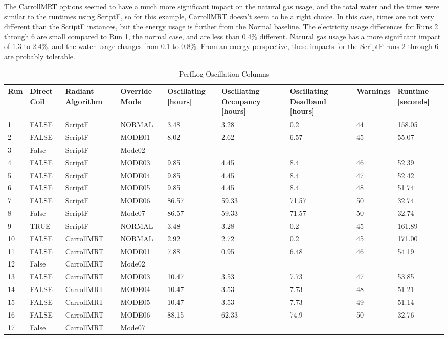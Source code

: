 The CarrollMRT options seemed to have a much more significant impact on the natural gas usage, and the total water and the times were similar to the runtimes using ScriptF, so for this example, CarrollMRT doesn’t seem to be a right choice. In this case, times are not very different than the ScriptF instances, but the energy usage is further from the Normal baseline. The electricity usage differences for Runs 2 through 6 are small compared to Run 1, the normal case, and are less than 0.4\% different. Natural gas usage has a more significant impact of 1.3 to 2.4\%, and the water usage changes from 0.1 to 0.8\%. From an energy perspective, these impacts for the ScriptF runs 2 through 6 are probably tolerable. 


{\scriptsize
\begin{longtable}[c]{p{0.2in}p{0.4in}p{0.6in}p{0.7in}p{0.5in}p{0.5in}p{0.7in}p{0.6in}p{0.65in}}
\caption{PerfLog Oscillation Columns\label{table:perflog_mode_columns}} \tabularnewline
\toprule
Run & 
Direct Coil & 
Radiant Algorithm & 
Override Mode & 
  Oscillating {[}hours{]} &
  Oscillating Occupancy {[}hours{]} &
  Oscillating Deadband {[}hours{]} &
  Warnings &
  Runtime {[}seconds{]} \tabularnewline
\midrule
\endfirsthead
1  & FALSE & ScriptF    & NORMAL & 3.48  & 3.28  & 0.2   & 44 & 158.05 \tabularnewline
2  & FALSE & ScriptF    & MODE01 & 8.02  & 2.62  & 6.57  & 45 & 55.07  \tabularnewline
3  & False & ScriptF    & Mode02 &       &       &       &    &        \tabularnewline
4  & FALSE & ScriptF    & MODE03 & 9.85  & 4.45  & 8.4   & 46 & 52.39  \tabularnewline
5  & FALSE & ScriptF    & MODE04 & 9.85  & 4.45  & 8.4   & 47 & 52.42  \tabularnewline
6  & FALSE & ScriptF    & MODE05 & 9.85  & 4.45  & 8.4   & 48 & 51.74  \tabularnewline
7  & FALSE & ScriptF    & MODE06 & 86.57 & 59.33 & 71.57 & 50 & 32.74  \tabularnewline
8  & False & ScriptF    & Mode07 & 86.57 & 59.33 & 71.57 & 50 & 32.74  \tabularnewline
9  & TRUE  & ScriptF    & NORMAL & 3.48  & 3.28  & 0.2   & 45 & 161.89 \tabularnewline
10 & FALSE & CarrollMRT & NORMAL & 2.92  & 2.72  & 0.2   & 45 & 171.00 \tabularnewline
11 & FALSE & CarrollMRT & MODE01 & 7.88  & 0.95  & 6.48  & 46 & 54.19  \tabularnewline
12 & False & CarrollMRT & Mode02 &       &       &       &    &        \tabularnewline
13 & FALSE & CarrollMRT & MODE03 & 10.47 & 3.53  & 7.73  & 47 & 53.85  \tabularnewline
14 & FALSE & CarrollMRT & MODE04 & 10.47 & 3.53  & 7.73  & 48 & 51.21  \tabularnewline
15 & FALSE & CarrollMRT & MODE05 & 10.47 & 3.53  & 7.73  & 49 & 51.14  \tabularnewline
16 & FALSE & CarrollMRT & MODE06 & 88.15 & 62.33 & 74.9  & 50 & 32.76  \tabularnewline
17 & False & CarrollMRT & Mode07 &       &       &       &    &        \tabularnewline
\bottomrule
\end{longtable}
}


